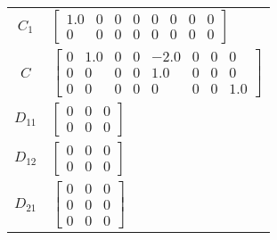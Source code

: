 \begin{tabular}{cl}
 $C_{1}$  & $\left[\begin{matrix}1.0 & 0 & 0 & 0 & 0 & 0 & 0 & 0\\0 & 0 & 0 & 0 & 0 & 0 & 0 & 0\end{matrix}\right]$                                                                                                                                                                                                                                                      \\
   $C$    & $\left[\begin{matrix}0 & 1.0 & 0 & 0 & -2.0 & 0 & 0 & 0\\0 & 0 & 0 & 0 & 1.0 & 0 & 0 & 0\\0 & 0 & 0 & 0 & 0 & 0 & 0 & 1.0\end{matrix}\right]$                                                                                                                                                                                                                \\
 $D_{11}$ & $\left[\begin{matrix}0 & 0 & 0\\0 & 0 & 0\end{matrix}\right]$                                                                                                                                                                                                                                                                                                \\
 $D_{12}$ & $\left[\begin{matrix}0 & 0 & 0\\0 & 0 & 0\end{matrix}\right]$                                                                                                                                                                                                                                                                                                \\
 $D_{21}$ & $\left[\begin{matrix}0 & 0 & 0\\0 & 0 & 0\\0 & 0 & 0\end{matrix}\right]$                                                                                                                                                                                                                                                                                     \\
\hline
\end{tabular}